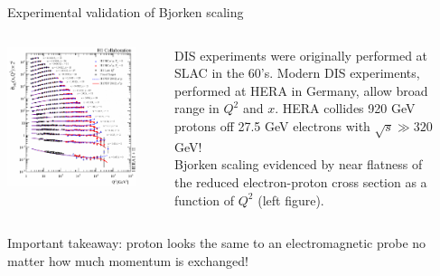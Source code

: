 \documentclass[svgnames]{beamer}
\begin{document}
\begin{frame}{Experimental validation of Bjorken scaling}
    \begin{columns}
    \begin{column}{0.455\textwidth}
        \includegraphics[width=\columnwidth]{structure_func}
    \end{column}
    \begin{column}{0.025\textwidth}
    \end{column}
    \begin{column}{0.455\textwidth}
        DIS experiments were originally performed at SLAC in the 60's. Modern DIS experiments, performed at HERA in Germany, allow broad range in $Q^2$ and $x$. HERA collides 920 GeV protons off 27.5 GeV electrons with $\sqrt{s} \gg 320$ GeV! \medskip \\ 
        Bjorken scaling evidenced by near flatness of the reduced electron-proton cross section as a function of $Q^2$ (left figure). 
    \end{column}
    \begin{column}{0.025\textwidth}
    \end{column}
    \end{columns}
    \medskip
    Important takeaway: proton looks the same to an electromagnetic probe no matter how much momentum is exchanged!
\end{frame}
\end{document}
